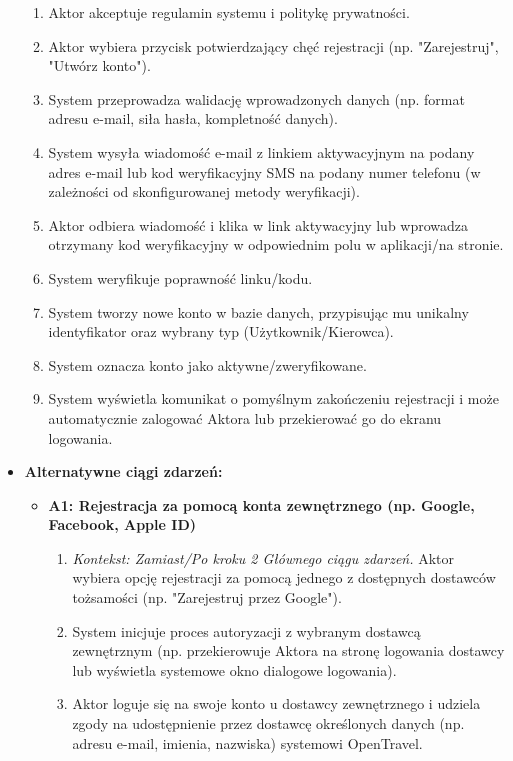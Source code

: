 \documentclass[a4paper,12pt]{article}
\begin{document}
\begin{itemize}
\begin{enumerate}
            \item Aktor akceptuje regulamin systemu i politykę prywatności.
            \item Aktor wybiera przycisk potwierdzający chęć rejestracji (np. "Zarejestruj", "Utwórz konto").
            \item System przeprowadza walidację wprowadzonych danych (np. format adresu e-mail, siła hasła, kompletność danych).
            \item System wysyła wiadomość e-mail z linkiem aktywacyjnym na podany adres e-mail lub kod weryfikacyjny SMS na podany numer telefonu (w zależności od skonfigurowanej metody weryfikacji).
            \item Aktor odbiera wiadomość i klika w link aktywacyjny lub wprowadza otrzymany kod weryfikacyjny w odpowiednim polu w aplikacji/na stronie.
            \item System weryfikuje poprawność linku/kodu.
            \item System tworzy nowe konto w bazie danych, przypisując mu unikalny identyfikator oraz wybrany typ (Użytkownik/Kierowca).
            \item System oznacza konto jako aktywne/zweryfikowane.
            \item System wyświetla komunikat o pomyślnym zakończeniu rejestracji i może automatycznie zalogować Aktora lub przekierować go do ekranu logowania.
        \end{enumerate}
    \item \textbf{Alternatywne ciągi zdarzeń:}
        \begin{itemize}
            \item \textbf{A1: Rejestracja za pomocą konta zewnętrznego (np. Google, Facebook, Apple ID)}
                \begin{enumerate}
                    \item \textit{Kontekst: Zamiast/Po kroku 2 Głównego ciągu zdarzeń.} Aktor wybiera opcję rejestracji za pomocą jednego z dostępnych dostawców tożsamości (np. "Zarejestruj przez Google").
                    \item System inicjuje proces autoryzacji z wybranym dostawcą zewnętrznym (np. przekierowuje Aktora na stronę logowania dostawcy lub wyświetla systemowe okno dialogowe logowania).
                    \item Aktor loguje się na swoje konto u dostawcy zewnętrznego i udziela zgody na udostępnienie przez dostawcę określonych danych (np. adresu e-mail, imienia, nazwiska) systemowi OpenTravel.

\end{enumerate}
\end{itemize}
\end{itemize}
\end{document}
